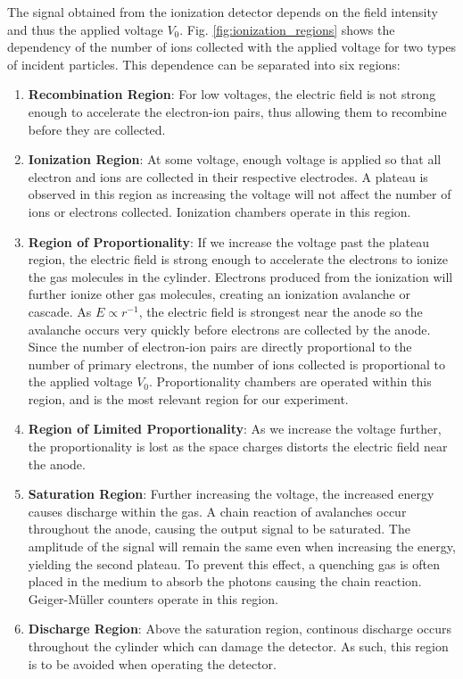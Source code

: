 \documentclass[a4paper]{report}
\numberwithin{equation}{section}
\begin{document}
The signal obtained from the ionization detector depends on the field intensity and thus the applied voltage $V_0$. Fig. \ref{fig:ionization_regions} shows the 
dependency of the number of ions collected with the applied voltage for two types of incident particles. This dependence can be separated into six regions:
\begin{enumerate}
	\item \textbf{Recombination Region}: For low voltages, the electric field is not strong enough to accelerate the electron-ion pairs, thus allowing them to recombine 
			before they are collected.
	\item \textbf{Ionization Region}: At some voltage, enough voltage is applied so that all electron and ions are collected in their respective electrodes. 
			A plateau is observed in this region as increasing the voltage will not affect the number of ions or electrons collected. Ionization chambers operate in this region.
	\item \textbf{Region of Proportionality}: If we increase the voltage past the plateau region, the electric field is strong enough to accelerate the electrons to ionize the gas molecules 
			in the cylinder. Electrons produced from the ionization will further ionize other gas molecules, creating an ionization avalanche or cascade. As $E \propto r^{-1}$,
			the electric field is strongest near the anode so the avalanche occurs very quickly before electrons are collected by the anode. Since the number of electron-ion
			pairs are directly proportional to the number of primary electrons, the number of ions collected is proportional to the applied voltage $V_0$. Proportionality
			chambers are operated within this region, and is the most relevant region for our experiment.
	\item \textbf{Region of Limited Proportionality}: As we increase the voltage further, the proportionality is lost as the space charges distorts the electric field
			near the anode. 
	\item \textbf{Saturation Region}: Further increasing the voltage, the increased energy causes discharge within the gas. A chain reaction of avalanches occur 
			throughout the anode, causing the output signal to be saturated. The amplitude of the signal will remain the same even when increasing the energy, 
			yielding the second plateau. To prevent this effect, a quenching gas is often placed in the medium to absorb the photons causing the chain reaction. 
			Geiger-M{\"u}ller counters operate in this region.
	\item \textbf{Discharge Region}: Above the saturation region, continous discharge occurs throughout the cylinder which can damage the detector. As such, this region
			is to be avoided when operating the detector.
\end{enumerate}
\end{document}
